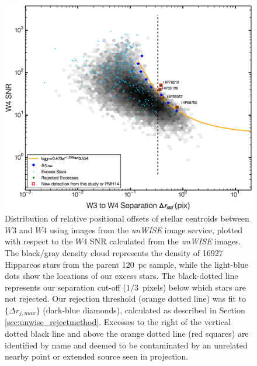 \begin{figure}
\centering
\includegraphics[scale=0.5]{Ch4/w3w4_snrvsep}
\caption{Distribution of relative positional offsets of stellar centroids between $W3$ and $W4$ using images from the \textit{unWISE} image service, plotted with respect to the $W4$ SNR calculated from the \textit{unWISE} images. The black/gray density cloud represents the density of 16927 Hipparcos stars from the parent 120~pc sample, while the light-blue dots show the locations of our excess stars. The black-dotted line represents our separation cut-off ($1/3$~pixels) below which stars are not rejected. Our rejection threshold (orange dotted line) was fit to $\{\Delta r_{j,max}\}$ (dark-blue diamonds), calculated as described in Section~ \ref{sec:unwise_rejectmethod}. Excesses to the right of the vertical dotted black line and above the orange dotted line (red squares) are identified by name and deemed to be contaminated by an unrelated nearby point or extended source seen in projection.}


\label{fig:w3w4_snrvsep}
\end{figure}

